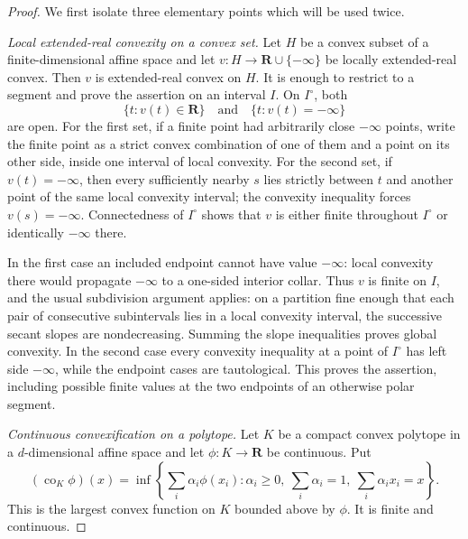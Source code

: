 
\begin{proof}
We first isolate three elementary points which will be used twice.

\medskip\noindent\emph{Local extended-real convexity on a convex set.}
Let \(H\) be a convex subset of a finite-dimensional affine space and let
\(v:H\to\mathbf R\cup\{-\infty\}\) be locally extended-real convex.  Then
\(v\) is extended-real convex on \(H\).  It is enough to restrict to a
segment and prove the assertion on an interval \(I\).  On
\(I^\circ\), both
\[
 \{t:v(t)\in\mathbf R\}
 \quad\text{and}\quad
 \{t:v(t)=-\infty\}
\]
are open.  For the first set, if a finite point had arbitrarily close
\(-\infty\) points, write the finite point as a strict convex combination
of one of them and a point on its other side, inside one interval of local
convexity.  For the second set, if \(v(t)=-\infty\), then every sufficiently
nearby \(s\) lies strictly between \(t\) and another point of the same
local convexity interval; the convexity inequality forces
\(v(s)=-\infty\).  Connectedness of \(I^\circ\) shows that \(v\) is either
finite throughout \(I^\circ\) or identically \(-\infty\) there.

In the first case an included endpoint cannot have value \(-\infty\):
local convexity there would propagate \(-\infty\) to a one-sided interior
collar.  Thus \(v\) is finite on \(I\), and the usual subdivision argument
applies: on a partition fine enough that each pair of consecutive
subintervals lies in a local convexity interval, the successive secant
slopes are nondecreasing.  Summing the slope inequalities proves global
convexity.  In the second case every convexity inequality at a point of
\(I^\circ\) has left side \(-\infty\), while the endpoint cases are
tautological.  This proves the assertion, including possible finite values
at the two endpoints of an otherwise polar segment.

\medskip\noindent\emph{Continuous convexification on a polytope.}
Let \(K\) be a compact convex polytope in a \(d\)-dimensional affine space
and let \(\phi:K\to\mathbf R\) be continuous.  Put
\begin{equation}
 (\operatorname{co}_K\phi)(x)
 =
 \inf\left\{
       \sum_i\alpha_i\phi(x_i):
       \alpha_i\geq0,\ \sum_i\alpha_i=1,\
       \sum_i\alpha_i x_i=x
      \right\}.
 \label{eq:p071-polyhedral-convex-envelope}
\end{equation}
This is the largest convex function on \(K\) bounded above by \(\phi\).
It is finite and continuous.


\end{proof}
